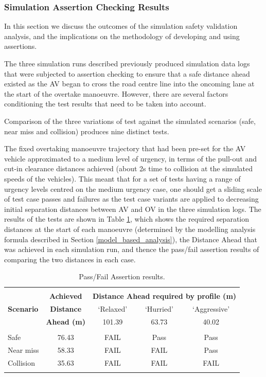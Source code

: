 \subsubsection{Simulation Assertion Checking 
Results} \label{sim_results}
In this section we discuss the outcomes of the simulation safety validation analysis, and the implications on the methodology of developing and using assertions.

The three simulation runs described previously produced simulation data logs that were subjected to assertion checking to ensure that a safe distance ahead existed as the AV began to cross the road centre line into the oncoming lane at the start of the overtake manoeuvre. However, there are several factors conditioning the test results that need to be taken into account.

Comparison of the three variations of test against the simulated scenarios (safe, near miss and collision) produces nine distinct tests. 

The fixed overtaking manoeuvre trajectory that had been pre-set for the AV vehicle approximated to a medium level of urgency, in terms of the pull-out and cut-in clearance distances achieved (about 2s time to collision at the simulated speeds of the vehicles). This meant that for a set of tests having a range of urgency levels centred on the medium urgency case, one should get a sliding scale of test case passes and failures as the test case variants are applied to decreasing initial separation distances between AV and OV in the three simulation logs. The results of the tests are shown in Table \ref{Overtaking_Profiles}, which shows the required separation distances at the start of each manoeuvre (determined by the modelling analysis formula described in Section \ref{model_based_analysis}), the Distance Ahead that was achieved in each simulation run, and thence the pass/fail assertion results of comparing the two distances in each case.

\begin{table}[h]
\centering
\begin{tabular}{lcccc}
\hline
\\
\multirow{3}{*}{\textbf{Scenario}} & \textbf{Achieved} & \multicolumn{3}{c}{
\textbf{Distance Ahead required by profile (m)}}\\ %
& \textbf{Distance} & `Relaxed' & `Hurried' & `Aggressive' \\
& \textbf{Ahead (m)} & 101.39 & 63.73 & 40.02 \\
\\
%
Safe & 76.43 & FAIL & Pass & Pass\\
%
Near miss & 58.33 & FAIL & FAIL & Pass\\
%
Collision & 35.63 & FAIL & FAIL & FAIL\\
\\
\hline
\end{tabular}
\caption{Pass/Fail Assertion results.} \label{Overtaking_Profiles}
\end{table}


